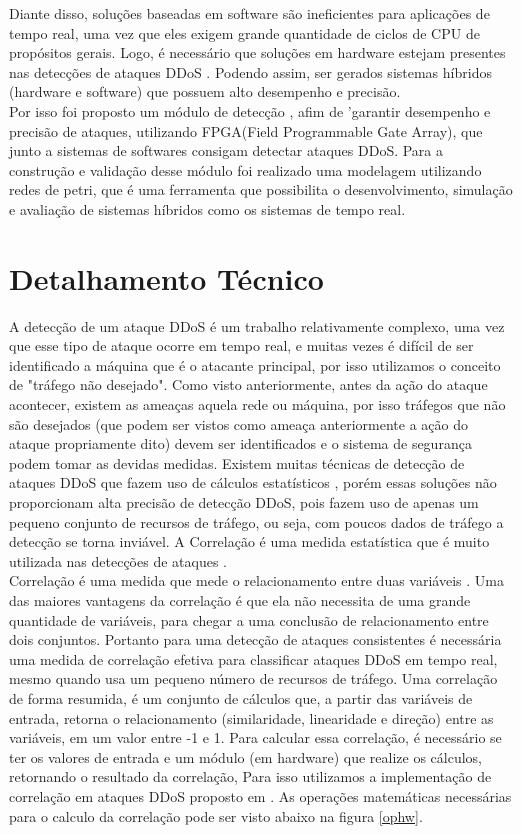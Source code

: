 \documentclass[conference]{IEEEtran}
\begin{document}
	Diante disso, soluções baseadas em software são ineficientes para aplicações de
	tempo real, uma vez que eles exigem grande quantidade de ciclos de CPU de propósitos
	gerais. Logo, é necessário que soluções em hardware estejam presentes nas detecções de ataques DDoS . Podendo assim, ser gerados sistemas híbridos (hardware e software) que possuem alto desempenho e precisão.\\
	Por isso foi proposto um módulo de detecção , afim de 'garantir desempenho e
	precisão de ataques, utilizando FPGA(Field Programmable Gate Array), que junto a sistemas de softwares consigam detectar ataques DDoS. Para a construção e validação desse módulo foi realizado uma modelagem utilizando redes de petri, que é uma ferramenta que possibilita o desenvolvimento, simulação e avaliação de sistemas híbridos como os sistemas de tempo real.

	
	\section{Detalhamento Técnico}
A detecção de um ataque DDoS é um trabalho relativamente complexo, uma vez
que esse tipo de ataque ocorre em tempo real, e muitas vezes é difícil de ser identificado a máquina que é o atacante principal, por isso utilizamos o conceito de "tráfego não desejado". Como visto anteriormente, antes da ação do ataque acontecer, existem as ameaças aquela rede ou máquina, por isso tráfegos que não são desejados (que podem ser vistos como ameaça anteriormente a ação do ataque propriamente dito) devem ser identificados e o sistema de segurança podem tomar as devidas medidas. Existem muitas técnicas de detecção de ataques DDoS que fazem uso de cálculos estatísticos \cite{b4}, porém essas soluções não proporcionam alta precisão de detecção DDoS, pois fazem uso de apenas um pequeno conjunto de recursos de tráfego, ou seja, com poucos dados de tráfego a detecção se torna inviável. A Correlação é uma medida estatística que é muito utilizada nas detecções de ataques \cite{b5}.\\
Correlação é uma medida que mede o relacionamento entre duas variáveis . Uma
das maiores vantagens da correlação é que ela não necessita de uma grande quantidade de
variáveis, para chegar a uma conclusão de relacionamento entre dois conjuntos. Portanto
para uma detecção de ataques consistentes é necessária uma medida de correlação efetiva
para classificar ataques DDoS em tempo real, mesmo quando usa um pequeno número
de recursos de tráfego. Uma correlação de forma resumida, é um conjunto de cálculos
que, a partir das variáveis de entrada, retorna o relacionamento (similaridade, linearidade e direção) entre as variáveis, em um valor entre -1 e 1. Para calcular essa correlação, é necessário se ter os valores de entrada e um módulo (em hardware) que realize os cálculos, retornando o resultado da correlação, Para isso utilizamos a implementação de correlação em ataques DDoS proposto em \cite{b2}. As operações matemáticas necessárias para o calculo da correlação pode ser visto abaixo na figura \ref{ophw}.
	
\end{document}
